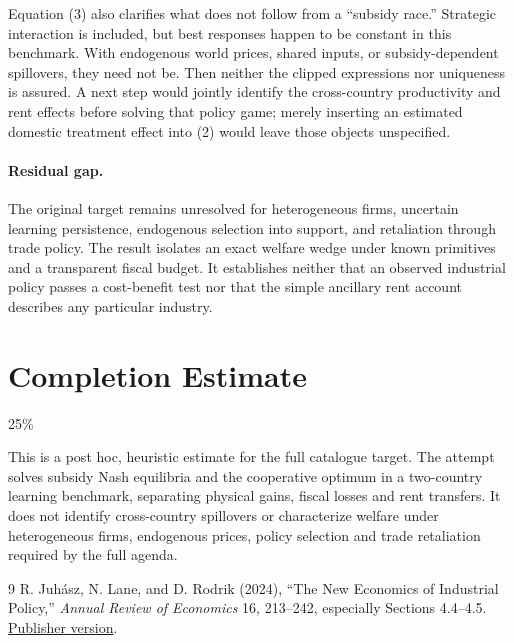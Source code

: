 \documentclass[11pt]{article}
\theoremstyle{definition}
\begin{document}
Equation (3) also clarifies what does not follow from a ``subsidy race.'' Strategic interaction is included, but best responses happen to be constant in this benchmark. With endogenous world prices, shared inputs, or subsidy-dependent spillovers, they need not be. Then neither the clipped expressions nor uniqueness is assured. A next step would jointly identify the cross-country productivity and rent effects before solving that policy game; merely inserting an estimated domestic treatment effect into (2) would leave those objects unspecified.

\paragraph{Residual gap.}
The original target remains unresolved for heterogeneous firms, uncertain learning persistence, endogenous selection into support, and retaliation through trade policy. The result isolates an exact welfare wedge under known primitives and a transparent fiscal budget. It establishes neither that an observed industrial policy passes a cost-benefit test nor that the simple ancillary rent account describes any particular industry.

\section{Completion Estimate}
25\%

This is a post hoc, heuristic estimate for the full catalogue target.
The attempt solves subsidy Nash equilibria and the cooperative optimum in a two-country learning benchmark, separating physical gains, fiscal losses and rent transfers. It does not identify cross-country spillovers or characterize welfare under heterogeneous firms, endogenous prices, policy selection and trade retaliation required by the full agenda.

\begin{thebibliography}{9}
 R. Juh\'asz, N. Lane, and D. Rodrik (2024), ``The New Economics of Industrial Policy,'' \emph{Annual Review of Economics} 16, 213--242, especially Sections 4.4--4.5. \href{https://www.annualreviews.org/doi/pdf/10.1146/annurev-economics-081023-024638}{Publisher version}.
\end{thebibliography}
\end{document}
